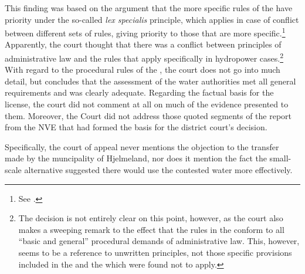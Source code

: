 This finding was based on the argument that the more specific rules of the \cite{wra17} have priority under the so-called {\it lex specialis} principle, which applies in case of conflict between different sets of rules, giving priority to those that are more specific.\footnote{See \cite[7]{jorpeland11a}.} Apparently, the court thought that there was a conflict between principles of administrative law and the rules that apply specifically in hydropower cases.\footnote{The decision is not entirely clear on this point, however, as the court also makes a sweeping remark to the effect that the rules in the \cite{wra17} conform to all ``basic and general'' procedural demands of administrative law. This, however, seems to be a reference to unwritten principles, not those specific provisions included in the \cite{paa67} and the \cite{ea59} which were found not to apply.} With regard to the procedural rules of the \cite{wra17}, the court does not go into much detail, but concludes that the assessment of the water authorities met all general requirements and was clearly adequate. Regarding the factual basis for the license, the court did not comment at all on much of the evidence presented to them. Moreover, the Court did not address those quoted segments of the report from the NVE that had formed the basis for the district court's decision.


Specifically, the court of appeal never mentions the objection to the transfer made by the muncipality of Hjelmeland, nor does it mention the fact the small-scale alternative suggested there would use the contested water more effectively. %

